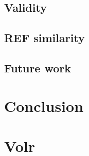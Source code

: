 \documentclass[a4paper,oneside]{memoir}
\begin{document}
  \section{Validity}
  \section{REF similarity}
  \section{Future work}

\chapter{Conclusion}

\printbibliography

\printglossary
\printindex

\appendix
\chapter{Volr} \label{appendix:volr}
  
\end{document}
